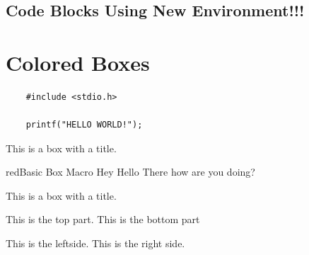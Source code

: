 \documentclass{article}
\begin{document}
\subsection{Code Blocks Using New Environment!!!}

    \lipsum[1-1]{}
\section{Colored Boxes}
\begin{tcolorbox}[colframe=gray]
    \begin{lstlisting}
    #include <stdio.h>

    printf("HELLO WORLD!");
    \end{lstlisting}
\end{tcolorbox}

\begin{tcolorbox}[
        title = {Most Basic Box I'd Use}
        ]
    This is a box with a title.
\end{tcolorbox}

\begin{basicbox}{red}{Basic Box Macro}
    Hey Hello There how are you doing?

\end{basicbox}

\begin{tcolorbox}[
        title = Colored Box With Title,
        colframe = green,
        coltitle = black,
        ]
    This is a box with a title.
\end{tcolorbox}

\begin{tcolorbox}[
        title = Horizontal split,
        colframe = blue,
        ]
This is the top part.
\tcblower
This is the bottom part
\end{tcolorbox}
\begin{tcolorbox}[
        sidebyside,
        title = Vertical split,
        colframe = red,
        ]
This is the leftside.
\tcblower
This is the right side.
\end{tcolorbox}
\end{document}
